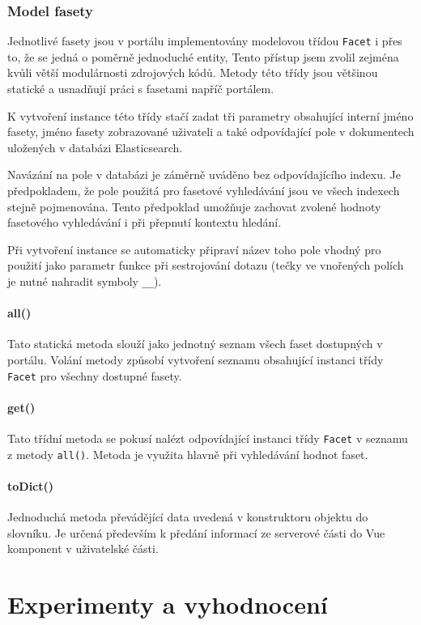 \subsection{Model fasety}
Jednotlivé fasety jsou v portálu implementovány modelovou třídou \texttt{Facet} i přes to, že se jedná o poměrně jednoduché entity, Tento přístup jsem zvolil zejména kvůli větší modulárnosti zdrojových kódů. Metody této třídy jsou většinou statické a usnadňují práci s fasetami napříč portálem.

K vytvoření instance této třídy stačí zadat tři parametry obsahující interní jméno fasety, jméno fasety zobrazované uživateli a také odpovídající pole v dokumentech uložených v databázi Elasticsearch. 

Navázání na pole v databázi je záměrně uváděno bez odpovídajícího indexu. Je předpokladem, že pole použitá pro fasetové vyhledávání jsou ve všech indexech stejně pojmenována. Tento předpoklad umožňuje zachovat zvolené hodnoty fasetového vyhledávání i při přepnutí kontextu hledání. 

Při vytvoření instance se automaticky připraví název toho pole vhodný pro použití jako parametr funkce při sestrojování dotazu (tečky ve vnořených polích je nutné nahradit symboly \texttt{\_\_}). 

\subsubsection*{all()}
Tato statická metoda slouží jako jednotný seznam všech faset dostupných v portálu. Volání metody způsobí vytvoření seznamu obsahující instanci třídy \texttt{Facet} pro všechny dostupné fasety.

\subsubsection*{get()}
Tato třídní metoda se pokusí nalézt odpovídající instanci třídy \texttt{Facet} v seznamu z metody \texttt{all()}. Metoda je využita hlavně při vyhledávání hodnot faset.

\subsubsection*{toDict()}
Jednoduchá metoda převádějící data uvedená v konstruktoru objektu do slovníku. Je určená především k předání informací ze serverové části do Vue komponent v uživatelské části.



\chapter{Experimenty a vyhodnocení}
\blindtext

